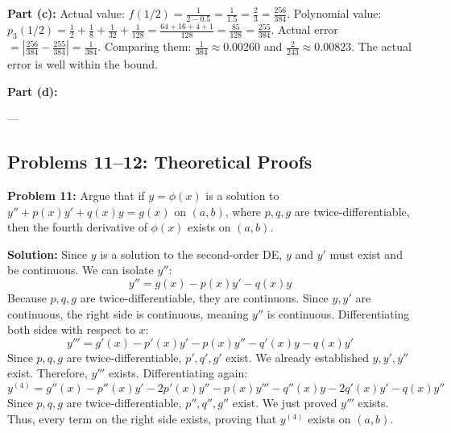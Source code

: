 \documentclass[11pt, letterpaper]{article}
\theoremstyle{definition}
\theoremstyle{remark}
\begin{document}
\textbf{Part (c):}
Actual value: $f(1/2) = \frac{1}{2 - 0.5} = \frac{1}{1.5} = \frac{2}{3} = \frac{256}{384}$.
Polynomial value: $p_3(1/2) = \frac{1}{2} + \frac{1}{8} + \frac{1}{32} + \frac{1}{128} = \frac{64 + 16 + 4 + 1}{128} = \frac{85}{128} = \frac{255}{384}$.
Actual error $= \left| \frac{256}{384} - \frac{255}{384} \right| = \frac{1}{384}$.
Comparing them: $\frac{1}{384} \approx 0.00260$ and $\frac{2}{243} \approx 0.00823$. The actual error is well within the bound.

\textbf{Part (d):}
\begin{center}
\end{center}

---

\subsection{Problems 11--12: Theoretical Proofs}

\textbf{Problem 11:} Argue that if $y = \phi(x)$ is a solution to $y'' + p(x)y' + q(x)y = g(x)$ on $(a, b)$, where $p, q, g$ are twice-differentiable, then the fourth derivative of $\phi(x)$ exists on $(a, b)$.

\textbf{Solution:}
Since $y$ is a solution to the second-order DE, $y$ and $y'$ must exist and be continuous. We can isolate $y''$:
\[ y'' = g(x) - p(x)y' - q(x)y \]
Because $p, q, g$ are twice-differentiable, they are continuous. Since $y, y'$ are continuous, the right side is continuous, meaning $y''$ is continuous.
Differentiating both sides with respect to $x$:
\[ y''' = g'(x) - p'(x)y' - p(x)y'' - q'(x)y - q(x)y' \]
Since $p, q, g$ are twice-differentiable, $p', q', g'$ exist. We already established $y, y', y''$ exist. Therefore, $y'''$ exists.
Differentiating again:
\[ y^{(4)} = g''(x) - p''(x)y' - 2p'(x)y'' - p(x)y''' - q''(x)y - 2q'(x)y' - q(x)y'' \]
Since $p, q, g$ are twice-differentiable, $p'', q'', g''$ exist. We just proved $y'''$ exists. Thus, every term on the right side exists, proving that $y^{(4)}$ exists on $(a, b)$.
\end{document}
